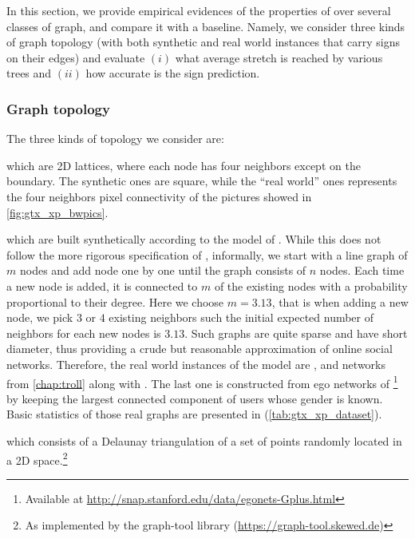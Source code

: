 In this section, we provide empirical evidences of the properties of
\gtx{} over several classes of graph, and compare it with a \bfs{} baseline.
Namely, we consider three kinds of
graph topology (with both synthetic and real world instances that carry signs on their edges) and
evaluate $(i)$ what average stretch is reached by various trees and $(ii)$ how accurate is the sign
prediction.

\subsubsection{Graph topology}

The three kinds of topology we consider are:
\begin{description}[leftmargin=*]
	\item[\grid{}] which are 2D lattices, where each node has four neighbors except on the boundary.
		The synthetic ones are square, while the \enquote{real world} ones represents the four neighbors
		pixel connectivity of the pictures showed in \autoref{fig:gtx_xp_bwpics}.
	\item[\lpa{}] which are built synthetically according to the model of \textcite{Barabasi1999}.
		While this does not follow the more rigorous specification of \textcite{PAmodel04}, informally,
		we start with a line graph of $m$ nodes and add node one by one until the graph consists of $n$
		nodes. Each time a new node is added, it is connected to $m$ of the existing nodes with a
		probability proportional to their degree. Here we choose $m=3.13$, that is when adding a new
		node, we pick $3$ or $4$ existing neighbors such the initial expected number of neighbors for
		each new nodes is $3.13$. Such graphs are quite sparse and have short diameter, thus providing a
		crude but reasonable approximation of online social networks. Therefore, the real world
		instances of the \lpa{} model are \wik{}, \sla{} and \epi{} networks from \autoref{chap:troll}
		 along with \gplus{}. The last one is constructed from
		ego networks of \gplus{}\footnote{Available at
		\url{http://snap.stanford.edu/data/egonets-Gplus.html}} by keeping the largest connected
		component of users whose gender is known. Basic statistics of those real \lpa{} graphs are
		presented in (\autoref{tab:gtx_xp_dataset}). 
	\item[\triangle{}] which consists of a Delaunay triangulation of a set of points randomly
		located in a 2D space.\footnote{As
		implemented by the \textsf{graph-tool} library (\url{https://graph-tool.skewed.de})}
\end{description}


